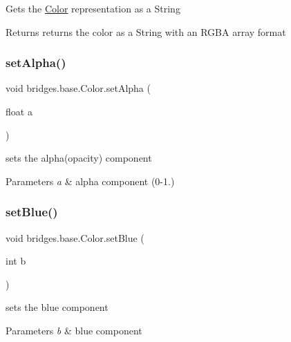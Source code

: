 Gets the \hyperlink{classbridges_1_1base_1_1_color}{Color} representation as a String

\begin{DoxyReturn}{Returns}
returns the color as a String with an R\+G\+BA array format 
\end{DoxyReturn}
\mbox{\label{classbridges_1_1base_1_1_color_afab07ce64efa1fa5797795670b0effb6}} 
\subsubsection{\texorpdfstring{set\+Alpha()}{setAlpha()}}
{\footnotesize\ttfamily void bridges.\+base.\+Color.\+set\+Alpha (\begin{DoxyParamCaption}\item[{float}]{a }\end{DoxyParamCaption})}

sets the alpha(opacity) component


\begin{DoxyParams}{Parameters}
{\em a} & alpha component (0-\/1.) \\
\hline
\end{DoxyParams}
\mbox{\label{classbridges_1_1base_1_1_color_a0e04156b1573cf8002c4d9cb69825657}} 
\subsubsection{\texorpdfstring{set\+Blue()}{setBlue()}}
{\footnotesize\ttfamily void bridges.\+base.\+Color.\+set\+Blue (\begin{DoxyParamCaption}\item[{int}]{b }\end{DoxyParamCaption})}

sets the blue component


\begin{DoxyParams}{Parameters}
{\em b} & blue component \\
\hline
\end{DoxyParams}
\mbox{\label{classbridges_1_1base_1_1_color_a5559b1c7eb4c3901526b1012029b528f}} 
